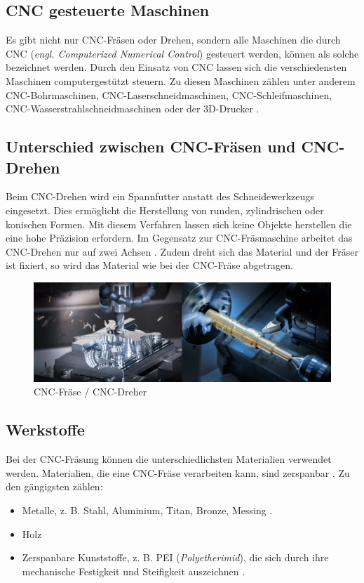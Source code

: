\subsection{CNC gesteuerte Maschinen}
Es gibt nicht nur CNC-Fräsen oder Drehen, sondern alle Maschinen die durch CNC (\textit{engl. Computerized Numerical Control}) gesteuert werden, können als solche bezeichnet werden. Durch den Einsatz von CNC lassen sich die verschiedensten Maschinen computergestützt steuern. Zu diesen Maschinen zählen unter anderem CNC-Bohrmaschinen,  CNC-Laserschneidmaschinen, CNC-Schleifmaschinen, CNC-Wasserstrahlschneidmaschinen oder der 3D-Drucker \parencite{ArtenCNCMaschinen}
. \\


\subsection{Unterschied zwischen CNC-Fräsen und CNC-Drehen}
Beim CNC-Drehen wird ein Spannfutter anstatt des Schneidewerkzeugs eingesetzt. Dies ermöglicht die Herstellung von runden, zylindrischen oder konischen Formen. Mit diesem Verfahren lassen sich keine Objekte herstellen die eine hohe Präzision erfordern. Im Gegensatz zur CNC-Fräsmaschine arbeitet das CNC-Drehen nur auf zwei Achsen \parencite{CNCDrehenUnterschied}. Zudem dreht sich das Material und der Fräser ist fixiert, so wird das Material wie bei der CNC-Fräse abgetragen. \\

\begin{figure}[H]
	\centering
	\includegraphics[width=0.6\linewidth]{images/CNCDrehenFraesen.png}
	\caption[CNC-Fräse / CNC-Dreher]{CNC-Fräse / CNC-Dreher}
	\label{fig:CNC Drehen vs Fraesen}
\end{figure}


\subsection{Werkstoffe}
Bei der CNC-Fräsung können die unterschiedlichsten Materialien verwendet werden. Materialien, die eine CNC-Fräse verarbeiten kann, sind zerspanbar  \parencite{PEIZerspannung}. Zu den gängigsten zählen:

\begin{itemize}
	\item Metalle, z. B. Stahl, Aluminium, Titan, Bronze, Messing \parencite{CNCFraesen3}.
	\item Holz
	\item Zerspanbare Kunststoffe, z. B. PEI (\textit{Polyetherimid}), die sich durch ihre mechanische Festigkeit und Steifigkeit auszeichnen \parencite{PEIKunststoffPolyetherimid}.
\end{itemize}


